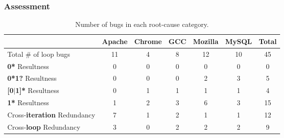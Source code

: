 \subsubsection{Assessment}
\label{sec:study_ob}


\begin{table*}[tb!]
\small
\centering
{
\begin{tabular}{|lcccccc|}
\hline
&Apache&Chrome&GCC&Mozilla&MySQL&Total\\
\hline
Total \# of loop bugs & 11 & 4 & 8 & 12 & 10 & 45 \\
\hline
\multicolumn{1}{|l}{ {\bf 0*} Resultness}
&0&0&0&0&0&0\\
\multicolumn{1}{|l}{ {\bf 0*1?} Resultness}
&0&0&0&2&3&5\\
\multicolumn{1}{|l}{{\bf [0$|$1]*} Resultness}
&0&1&1&1&1&4\\
\multicolumn{1}{|l}{{\bf 1*} Resultness}
&1&2&3&6&3&15\\
\hline
\multicolumn{1}{|l}{Cross-{\bf iteration} Redundancy}
&7&1&2&1&1&12\\
\multicolumn{1}{|l}{ Cross-{\bf loop} Redundancy}
&3&0&2&2&2&9\\
\hline
\end{tabular}
}
\caption{Number of bugs in each root-cause category. 
}
\label{tab:root}
\end{table*}






\def\cca#1{\cellcolor{black!#10}\ifnum #1>5\color{white}\fi{#1}}



